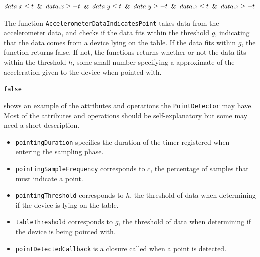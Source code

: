 \begin{algorithm}
  \begin{algorithmic}
      \State \Return $data.x \leq t \And data.x \geq -t \And data.y \leq t \And data.y \geq -t \And data.z \leq t \And data.z \geq -t$
    \EndFunction
  \end{algorithmic}
\end{algorithm}

The function \texttt{AccelerometerDataIndicatesPoint} takes data from the accelerometer data, 
and checks if the data fits within the threshold $g$, 
indicating that the data comes from a device lying on the table. 
If the data fits within $g$, 
the function returns false. 
If not, the functions returns whether or not the data fits within the threshold $h$, 
some small number specifying a approximate of the acceleration given to the device when pointed with.

\begin{algorithm}
  \begin{algorithmic}
    \State \Return \texttt{false}
    \Else
    \State \Return {}
    \EndIf
    \EndFunction
  \end{algorithmic}
\end{algorithm}

 shows an example of the attributes and operations the \texttt{PointDetector} may have. 
Most of the attributes and operations should be self-explanatory but some may need a short description.

\begin{itemize}
  \item \texttt{pointingDuration} specifies the duration of the timer registered when entering the sampling phase.
  \item \texttt{pointingSampleFrequency} corresponds to $c$, the percentage of samples that must indicate a point.
  \item \texttt{pointingThreshold} corresponds to $h$, the threshold of data when determining if the device is lying on the table.
  \item \texttt{tableThreshold} corresponds to $g$, the threshold of data when determining if the device is being pointed with.
  \item \texttt{pointDetectedCallback} is a closure called when a point is detected.
\end{itemize}

